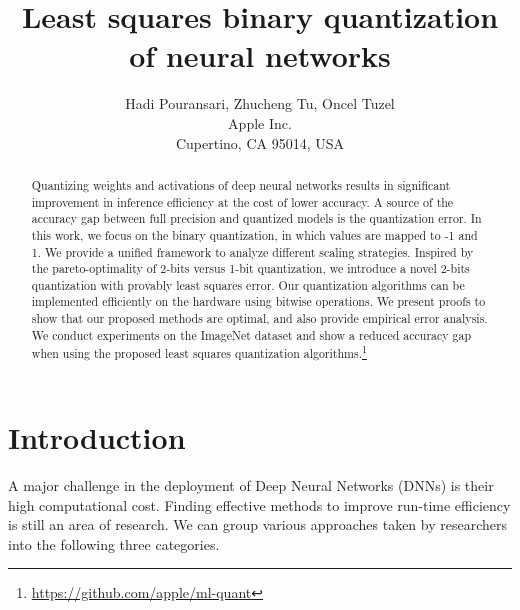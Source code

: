 \documentclass[10pt,twocolumn,letterpaper]{article}
\begin{document}
\title{Least squares binary quantization of neural networks}


\author{Hadi Pouransari, Zhucheng Tu, Oncel Tuzel\\
Apple Inc.\\
Cupertino, CA 95014, USA \\
}

\maketitle

\begin{abstract}
Quantizing weights and activations of deep neural networks results in significant improvement in inference efficiency at the cost of lower accuracy. A source of the accuracy gap between full precision and quantized models is the quantization error.
In this work, we focus on the binary quantization, in which values are mapped to -1 and 1. 
We provide a unified framework to analyze different scaling strategies.
Inspired by the pareto-optimality of 2-bits versus 1-bit quantization, we introduce a novel 2-bits quantization with provably least squares error.
Our quantization algorithms can be implemented efficiently on the hardware using bitwise operations.
We present proofs to show that our proposed methods are optimal, and also provide empirical error analysis.
We conduct experiments on the ImageNet dataset and show a reduced accuracy gap when using the proposed least squares quantization algorithms.\footnote{\url{https://github.com/apple/ml-quant}}
\end{abstract}

\section{Introduction}

A major challenge in the deployment of Deep Neural Networks (DNNs) is their high computational cost. 
Finding effective methods to improve run-time efficiency is still an area of research. We can group various approaches taken by researchers into the following three categories.
\end{document}
